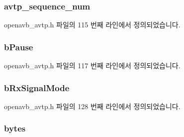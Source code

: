 \subsubsection[{\texorpdfstring{avtp\+\_\+sequence\+\_\+num}{avtp_sequence_num}}]{ avtp\+\_\+sequence\+\_\+num}\hypertarget{structavtp__stream__t_a56abc5c750ed448e7ca88ac571feb962}{}\label{structavtp__stream__t_a56abc5c750ed448e7ca88ac571feb962}


openavb\+\_\+avtp.\+h 파일의 115 번째 라인에서 정의되었습니다.

\subsubsection[{\texorpdfstring{b\+Pause}{bPause}}]{ b\+Pause}\hypertarget{structavtp__stream__t_a094a344391aa86a98299bac3deb91ce6}{}\label{structavtp__stream__t_a094a344391aa86a98299bac3deb91ce6}


openavb\+\_\+avtp.\+h 파일의 117 번째 라인에서 정의되었습니다.

\subsubsection[{\texorpdfstring{b\+Rx\+Signal\+Mode}{bRxSignalMode}}]{ b\+Rx\+Signal\+Mode}\hypertarget{structavtp__stream__t_aa3e26a0875dca06ce8a6040be346c595}{}\label{structavtp__stream__t_aa3e26a0875dca06ce8a6040be346c595}


openavb\+\_\+avtp.\+h 파일의 128 번째 라인에서 정의되었습니다.

\subsubsection[{\texorpdfstring{bytes}{bytes}}]{ bytes}\hypertarget{structavtp__stream__t_aaef33f7869026b185b6ba7b899c324f4}{}\label{structavtp__stream__t_aaef33f7869026b185b6ba7b899c324f4}


